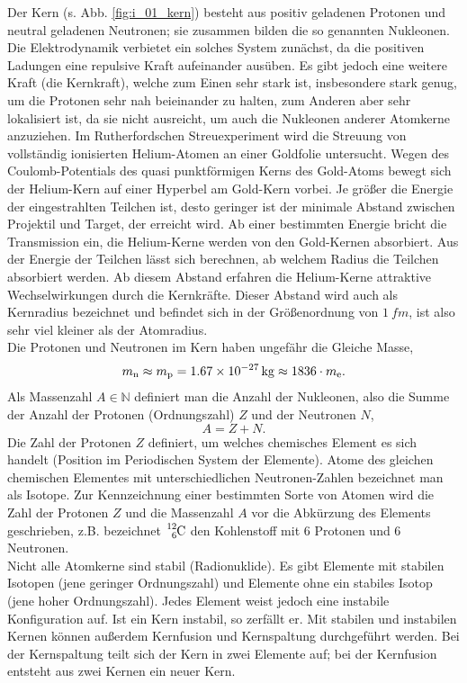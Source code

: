 Der Kern (s. Abb. \ref{fig:i_01_kern}) besteht aus positiv geladenen Protonen und neutral geladenen Neutronen; sie zusammen bilden die so genannten Nukleonen. Die Elektrodynamik verbietet ein solches System zunächst, da die positiven Ladungen eine repulsive Kraft aufeinander ausüben. Es gibt jedoch eine weitere Kraft (die Kernkraft), welche zum Einen sehr stark ist, insbesondere stark genug, um die Protonen sehr nah beieinander zu halten, zum Anderen aber sehr lokalisiert ist, da sie nicht ausreicht, um auch die Nukleonen anderer Atomkerne anzuziehen. Im Rutherfordschen Streuexperiment wird die Streuung von vollständig ionisierten Helium-Atomen an einer Goldfolie untersucht. Wegen des Coulomb-Potentials des quasi punktförmigen Kerns des Gold-Atoms bewegt sich der Helium-Kern auf einer Hyperbel am Gold-Kern vorbei. Je größer die Energie der eingestrahlten Teilchen ist, desto geringer ist der minimale Abstand zwischen Projektil und Target, der erreicht wird. Ab einer bestimmten Energie bricht die Transmission ein, die Helium-Kerne werden von den Gold-Kernen absorbiert. Aus der Energie der Teilchen lässt sich berechnen, ab welchem Radius die Teilchen absorbiert werden. Ab diesem Abstand erfahren die Helium-Kerne attraktive Wechselwirkungen durch die Kernkräfte. Dieser Abstand wird auch als Kernradius bezeichnet und befindet sich in der Größenordnung von $\SI{1}{fm}$, ist also sehr viel kleiner als der Atomradius. \cite{HW03}\\
Die Protonen und Neutronen im Kern haben ungefähr die Gleiche Masse,
\begin{equation}
m_\textrm n \approx m_\textrm p = \SI{1,67E-27}{kg} \approx 1836 \cdot m_\textrm e.
\end{equation}
Als Massenzahl $A \in \mathbb{N}$ definiert man die Anzahl der Nukleonen, also die Summe der Anzahl der Protonen (Ordnungszahl) $Z$ und der Neutronen $N$,
\begin{equation}
A = Z + N.
\end{equation}
Die Zahl der Protonen $Z$ definiert, um welches chemisches Element es sich handelt (Position im Periodischen System der Elemente). Atome des gleichen chemischen Elementes mit unterschiedlichen Neutronen-Zahlen bezeichnet man als Isotope. Zur Kennzeichnung einer bestimmten Sorte von Atomen wird die Zahl der Protonen $Z$ und die Massenzahl $A$ vor die Abkürzung des Elements geschrieben, z.B. bezeichnet $\ce{_6^{12} C}$ den Kohlenstoff mit $6$ Protonen und $6$ Neutronen.\\
Nicht alle Atomkerne sind stabil (Radionuklide). Es gibt Elemente mit stabilen Isotopen (jene geringer Ordnungszahl) und Elemente ohne ein stabiles Isotop (jene hoher Ordnungszahl). Jedes Element weist jedoch eine instabile Konfiguration auf. Ist ein Kern instabil, so zerfällt er. Mit stabilen und instabilen Kernen können außerdem Kernfusion und Kernspaltung durchgeführt werden. Bei der Kernspaltung teilt sich der Kern in zwei Elemente auf; bei der Kernfusion entsteht aus zwei Kernen ein neuer Kern.\\
